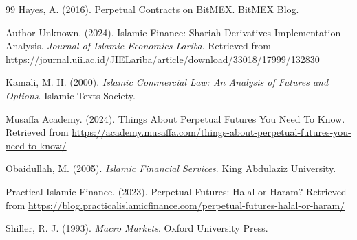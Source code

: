 \documentclass[10pt,twocolumn]{article}
\begin{document}
\begin{thebibliography}{99}
Hayes, A. (2016).
Perpetual Contracts on BitMEX.
BitMEX Blog.

Author Unknown. (2024).
Islamic Finance: Shariah Derivatives Implementation Analysis.
\textit{Journal of Islamic Economics Lariba}.
Retrieved from \url{https://journal.uii.ac.id/JIELariba/article/download/33018/17999/132830}

Kamali, M. H. (2000).
\textit{Islamic Commercial Law: An Analysis of Futures and Options}.
Islamic Texts Society.

Musaffa Academy. (2024).
Things About Perpetual Futures You Need To Know.
Retrieved from \url{https://academy.musaffa.com/things-about-perpetual-futures-you-need-to-know/}

Obaidullah, M. (2005).
\textit{Islamic Financial Services}.
King Abdulaziz University.

Practical Islamic Finance. (2023).
Perpetual Futures: Halal or Haram?
Retrieved from \url{https://blog.practicalislamicfinance.com/perpetual-futures-halal-or-haram/}

Shiller, R. J. (1993).
\textit{Macro Markets}.
Oxford University Press.

\end{thebibliography}
\end{document}
